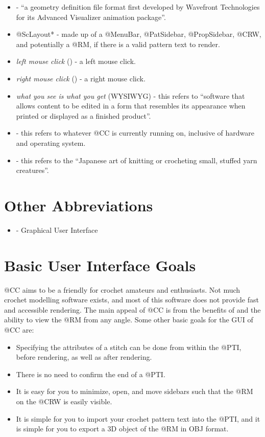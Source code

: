 \documentclass[main.tex]{subfiles}
\begin{document}
\begin{itemize}
\item {} - ``a geometry definition file format first developed by Wavefront Technologies for its Advanced Visualizer animation package''.
\item @ScLayout* - made up of a @MenuBar, @PatSidebar, @PropSidebar, @CRW, and potentially a @RM, if there is a valid pattern text to render.
\item \emph{left mouse click} () - a left mouse click. 
\item \emph{right mouse click} () - a right mouse click.
\item \emph{what you see is what you get} (WYSIWYG) - this refers to ``software that allows content to be edited in a form that resembles its appearance when printed or displayed as a finished product''.
\item {} - this refers to whatever @CC is currently running on, inclusive of hardware and operating system.
\item {} - this refers to the ``Japanese art of knitting or crocheting small, stuffed yarn creatures''.
\end{itemize}

\section{Other Abbreviations}

\begin{itemize}
\item {} - Graphical User Interface
\end{itemize}

\section{Basic User Interface Goals}

@CC aims to be a friendly  for crochet amateurs and enthusiasts. Not much crochet modelling software exists, and most of this software does not provide fast and accessible rendering. The main appeal of @CC is from the benefits of  and the ability to view the @RM from any angle. Some other basic goals for the GUI of @CC are:

\begin{itemize}
\item Specifying the attributes of a stitch can be done from within the @PTI, before rendering, as well as after rendering.
\item There is no need to confirm the end of a @PTI.
\item It is easy for you to minimize, open, and move sidebars such that the @RM on the @CRW is easily visible.
\item It is simple for you to import your crochet pattern text into the @PTI, and it is simple for you to export a 3D object of the @RM in OBJ format.
\end{itemize}
\end{document}

